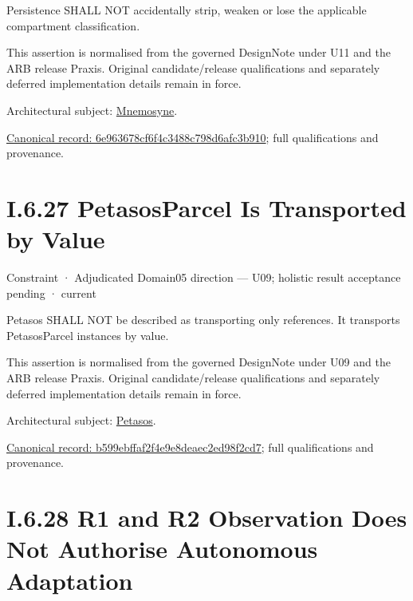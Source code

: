 Persistence SHALL NOT accidentally strip, weaken or lose the applicable compartment classification.



This assertion is normalised from the governed DesignNote under U11 and the ARB release Praxis. Original candidate/release qualifications and separately deferred implementation details remain in force.



Architectural subject: \hyperref[element:7985e647bf9e4ca3ba70faf9e3e4ae02]{Mnemosyne}.


{\footnotesize \href{../../../../../../../continuum/motivation/constraint/6e963678cf6f4c3488c798d6afc3b910.md}{Canonical record: 6e963678cf6f4c3488c798d6afc3b910}; full qualifications and provenance.}\par
\section*{I.6.27 PetasosParcel Is Transported by Value}
\label{navigation:I.6.27}

\label{element:b599ebffaf2f4e9e8deaec2ed98f2cd7}
{\small Constraint · Adjudicated Domain05 direction — U09; holistic result acceptance pending · current}\par

Petasos SHALL NOT be described as transporting only references. It transports PetasosParcel instances by value.



This assertion is normalised from the governed DesignNote under U09 and the ARB release Praxis. Original candidate/release qualifications and separately deferred implementation details remain in force.



Architectural subject: \hyperref[element:195e5f10db8e419391354197b5d7a8cc]{Petasos}.


{\footnotesize \href{../../../../../../../continuum/motivation/constraint/b599ebffaf2f4e9e8deaec2ed98f2cd7.md}{Canonical record: b599ebffaf2f4e9e8deaec2ed98f2cd7}; full qualifications and provenance.}\par
\section*{I.6.28 R1 and R2 Observation Does Not Authorise Autonomous Adaptation}
\label{navigation:I.6.28}

